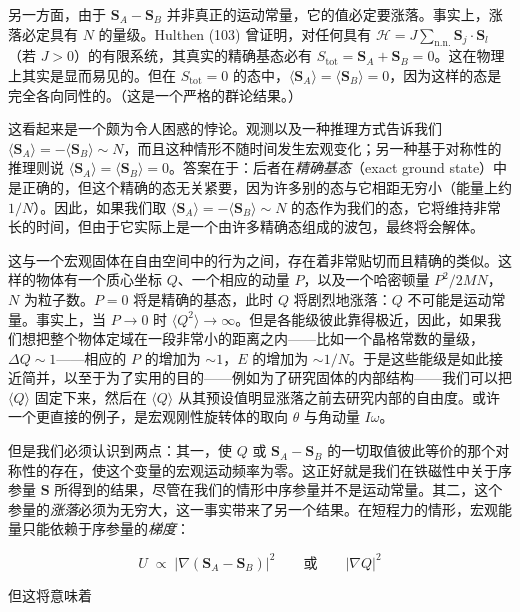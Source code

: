 另一方面，由于 $\mathbf{S}_A - \mathbf{S}_B$ 并非真正的运动常量，它的值必定要涨落。事实上，涨落必定具有 $N$ 的量级。Hulthen (103) 曾证明，对任何具有 $\mathcal{H} = J\sum_{\text{n.n.}}\mathbf{S}_j\cdot\mathbf{S}_l$（若 $J>0$）的有限系统，其真实的精确基态必有 $S_{\text{tot}} = \mathbf{S}_A + \mathbf{S}_B = 0$。这在物理上其实是显而易见的。但在 $S_{\text{tot}} = 0$ 的态中，$\langle \mathbf{S}_A\rangle = \langle \mathbf{S}_B\rangle = 0$，因为这样的态是完全各向同性的。（这是一个严格的群论结果。）

这看起来是一个颇为令人困惑的悖论。观测以及一种推理方式告诉我们 $\langle \mathbf{S}_A\rangle = -\langle \mathbf{S}_B\rangle \sim N$，而且这种情形不随时间发生宏观变化；另一种基于对称性的推理则说 $\langle \mathbf{S}_A\rangle = \langle \mathbf{S}_B\rangle = 0$。答案在于：后者在\emph{精确基态}（exact ground state）中是正确的，但这个精确的态无关紧要，因为许多别的态与它相距无穷小（能量上约 $1/N$）。因此，如果我们取 $\langle \mathbf{S}_A\rangle = -\langle \mathbf{S}_B\rangle \sim N$ 的态作为我们的态，它将维持非常长的时间，但由于它实际上是一个由许多精确态组成的波包，最终将会解体。

这与一个宏观固体在自由空间中的行为之间，存在着非常贴切而且精确的类似。这样的物体有一个质心坐标 $Q$、一个相应的动量 $P$，以及一个哈密顿量 $P^2/2MN$，$N$ 为粒子数。$P=0$ 将是精确的基态，此时 $Q$ 将剧烈地涨落：$Q$ 不可能是运动常量。事实上，当 $P\to 0$ 时 $\langle Q^2\rangle\to\infty$。但是各能级彼此靠得极近，因此，如果我们想把整个物体定域在一段非常小的距离之内——比如一个晶格常数的量级，$\Delta Q\sim 1$——相应的 $P$ 的增加为 $\sim 1$，$E$ 的增加为 $\sim 1/N$。于是这些能级是如此接近简并，以至于为了实用的目的——例如为了研究固体的内部结构——我们可以把 $\langle Q\rangle$ 固定下来，然后在 $\langle Q\rangle$ 从其预设值明显涨落之前去研究内部的自由度。或许一个更直接的例子，是宏观刚性旋转体的取向 $\theta$ 与角动量 $I\omega$。

但是我们必须认识到两点：其一，使 $Q$ 或 $\mathbf{S}_A - \mathbf{S}_B$ 的一切取值彼此等价的那个对称性的存在，使这个变量的宏观运动频率为零。这正好就是我们在铁磁性中关于序参量 $\mathbf{S}$ 所得到的结果，尽管在我们的情形中序参量并不是运动常量。其二，这个参量的\emph{涨落}必须为无穷大，这一事实带来了另一个结果。在短程力的情形，宏观能量只能依赖于序参量的\emph{梯度}：

\begin{equation*}
U \;\propto\; \bigl|\nabla\left(\mathbf{S}_A - \mathbf{S}_B\right)\bigr|^2 \qquad\text{或}\qquad \bigl|\nabla Q\bigr|^2
\end{equation*}

但这将意味着

